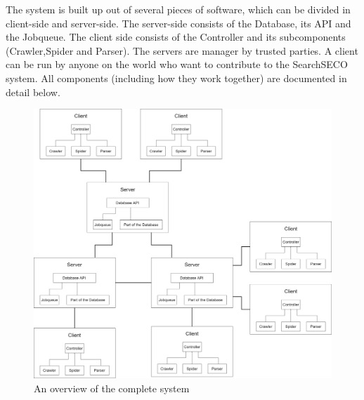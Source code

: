 \documentclass{article}
\begin{document}
The system is built up out of several pieces of software, which can be divided in client-side and server-side. The server-side consists of the Database, its API and the Jobqueue. The client side consists of the Controller and its subcomponents (Crawler,Spider and Parser). The servers are manager by trusted parties. A client can be run by anyone on the world who want to contribute to the SearchSECO system. All components (including how they work together) are documented in detail below. 
\begin{figure}[h]
    \centering
    \includegraphics[width = \linewidth]{system-overview.png}
    \caption{An overview of the complete system}
    \label{fig:sysoverview}
\end{figure}
\clearpage


\newpage










\end{document}
